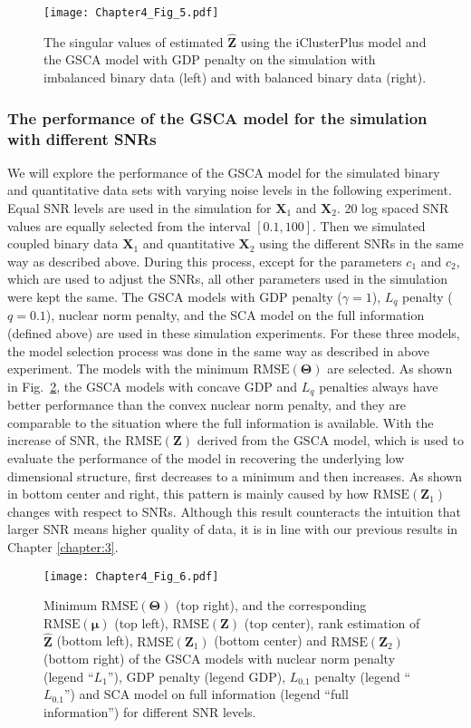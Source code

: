 \begin{figure}[htbp]
    \centering
    \texttt{[image: Chapter4\_Fig\_5.pdf]}
    \caption{The singular values of estimated $\hat{\mathbf{Z}}$ using the iClusterPlus model and the GSCA model with GDP penalty on the simulation with imbalanced binary data (left) and with balanced binary data (right).}
    \label{chapter4_fig:5}
\end{figure}

\subsubsection{The performance of the GSCA model for the simulation with different SNRs}
We will explore the performance of the GSCA model for the simulated binary and quantitative data sets with varying noise levels in the following experiment. Equal SNR levels are used in the simulation for $\mathbf{X}_1$ and $\mathbf{X}_2$. 20 log spaced SNR values are equally selected from the interval $[0.1, 100]$. Then we simulated coupled binary data $\mathbf{X}_1$ and quantitative $\mathbf{X}_2$ using the different SNRs in the same way as described above. During this process, except for the parameters $c_1$ and $c_2$, which are used to adjust the SNRs, all other parameters used in the simulation were kept the same. The GSCA models with GDP penalty ($\gamma=1$), $L_{q}$ penalty ($q=0.1$), nuclear norm penalty, and the SCA model on the full information (defined above) are used in these simulation experiments. For these three models, the model selection process was done in the same way as described in above experiment. The models with the minimum $\text{RMSE}(\mathbf{\Theta})$ are selected. As shown in Fig.~\ref{chapter4_fig:6}, the GSCA models with concave GDP and $L_{q}$ penalties always have better performance than the convex nuclear norm penalty, and they are comparable to the situation where the full information is available. With the increase of SNR, the $\text{RMSE}(\mathbf{Z})$ derived from the GSCA model, which is used to evaluate the performance of the model in recovering the underlying low dimensional structure, first decreases to a minimum and then increases. As shown in bottom center and right, this pattern is mainly caused by how $\text{RMSE}(\mathbf{Z}_1)$ changes with respect to SNRs. Although this result counteracts the intuition that larger SNR means higher quality of data, it is in line with our previous results in Chapter \ref{chapter:3}.

\begin{figure}[htbp]
    \centering
    \texttt{[image: Chapter4\_Fig\_6.pdf]}
    \caption{Minimum $\text{RMSE}(\mathbf{\Theta})$ (top right), and the corresponding $\text{RMSE}(\bm{\mu})$ (top left), $\text{RMSE}(\mathbf{Z})$ (top center), rank estimation of $\hat{\mathbf{Z}}$ (bottom left), $\text{RMSE}(\mathbf{Z}_1)$ (bottom center) and $\text{RMSE}(\mathbf{Z}_2)$ (bottom right) of the GSCA models with nuclear norm penalty (legend ``$L_{1}$''), GDP penalty (legend GDP), $L_{0.1}$ penalty (legend ``$L_{0.1}$'') and SCA model on full information (legend ``full information'') for different SNR levels.}
\label{chapter4_fig:6}
\end{figure}

